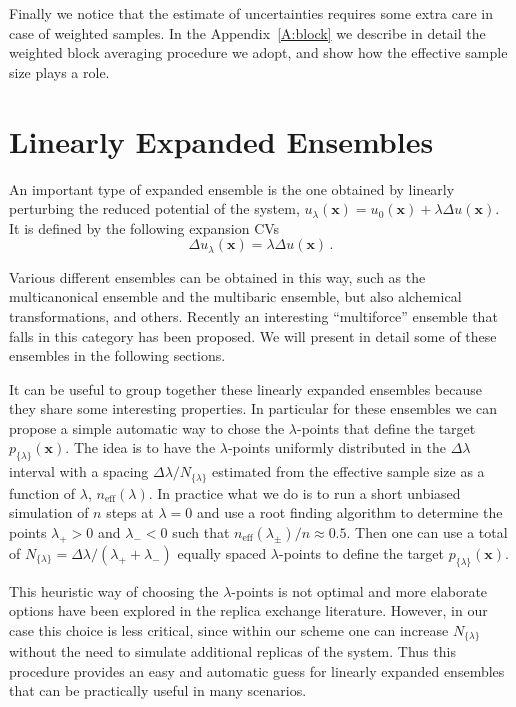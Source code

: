 \documentclass[aps,prx,reprint,superscriptaddress]{revtex4-1} %
\begin{document}
Finally we notice that the estimate of uncertainties requires some extra care in case of weighted samples\cite{Bussi2019}.
In the Appendix~\ref{A:block} we describe in detail the weighted block averaging procedure we adopt, and show how the effective sample size plays a role.


\section{Linearly Expanded Ensembles\label{S:linearly}}
An important type of expanded ensemble is the one obtained by linearly perturbing the reduced potential of the system, $u_\lambda(\mathbf{x})=u_0(\mathbf{x})+\lambda \Delta u(\mathbf{x})$.
It is defined by the following expansion CVs
\begin{equation}
    \Delta u_\lambda(\mathbf{x})=\lambda \Delta u(\mathbf{x})\, .
\end{equation}

Various different ensembles can be obtained in this way, such as the multicanonical ensemble and the multibaric ensemble, but also alchemical transformations, and others.
Recently an interesting ``multiforce'' ensemble that falls in this category has been proposed\cite{Hartmann2020}.
We will present in detail some of these ensembles in the following sections.

It can be useful to group together these linearly expanded ensembles because they share some interesting properties.
In particular for these ensembles we can propose a simple automatic way to chose the $\lambda$-points that define the target $p_{\{\lambda\}}(\mathbf{x})$.
The idea is to have the $\lambda$-points uniformly distributed in the $\Delta \lambda$ interval with a spacing $\Delta \lambda/N_{\{\lambda\}}$ estimated from the effective sample size as a function of $\lambda$, $n_{\text{eff}}(\lambda)$.
In practice what we do is to run a short unbiased simulation of $n$ steps at $\lambda=0$ and use a root finding algorithm to determine the points $\lambda_+>0$ and $\lambda_-<0$ such that  $n_{\text{eff}}(\lambda_\pm)/n \approx 0.5$.
Then one can use a total of $N_{\{\lambda\}}=\Delta \lambda/(\lambda_++\lambda_-)$ equally spaced $\lambda$-points to define the target $p_{\{\lambda\}}(\mathbf{x})$.

This heuristic way of choosing the $\lambda$-points is not optimal and more elaborate options have been explored in the replica exchange literature\cite{Prakash2011}.
However, in our case this choice is less critical, since within our scheme one can increase $N_{\{\lambda\}}$ without the need to simulate additional replicas of the system.
Thus this procedure provides an easy and automatic guess for linearly expanded ensembles that can be practically useful in many scenarios.
\end{document}
